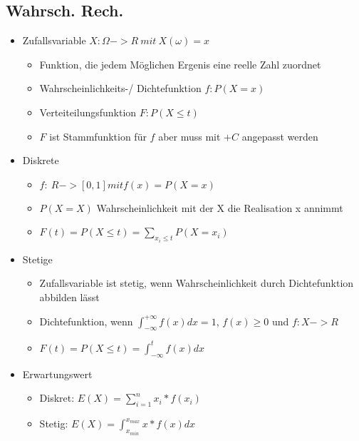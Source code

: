 \documentclass[a4paper]{article}
\begin{document}
\begin{landscape}
\begin{multicols}{4}
    \section{Wahrsch. Rech.}
    \begin{itemize}[noitemsep,nolistsep,leftmargin=*]
        \item Zufallsvariable $X : \Omega -> R\: mit\: X(\omega) = x$
        \begin{itemize}[noitemsep,nolistsep,leftmargin=*]
            \item Funktion, die jedem Möglichen Ergenis eine reelle Zahl zuordnet
            \item Wahrscheinlichkeits-/ Dichtefunktion $f: P(X =x)$
            \item Verteiteilungsfunktion $F: P(X  \leq t)$
            \item $F$ ist Stammfunktion für $f$ aber muss mit $+C$ angepasst werden
        \end{itemize}
        \item Diskrete
        \begin{itemize}[noitemsep,nolistsep,leftmargin=*]
            \item $f: \:R->[0,1] mit f(x)=P(X=x)$
            \item $P(X=X)$ Wahrscheinlichkeit mit der X die Realisation x annimmt
            \item $F(t) = P(X  \leq t) = \sum_{x_i  \leq t} P(X = x_i)$
        \end{itemize}
        \item Stetige
        \begin{itemize}[noitemsep,nolistsep,leftmargin=*]
            \item Zufallsvariable ist stetig, wenn Wahrscheinlichkeit durch Dichtefunktion abbilden lässt
            \item Dichtefunktion, wenn $\int^{+\infty}_{-\infty} f(x) dx = 1$, $f(x)  \geq 0$ und $f: X -> R$
            \item $F(t) = P(X  \leq t) = \int^{t}_{-\infty} f(x)dx$
        \end{itemize}
        \item Erwartungswert
        \begin{itemize}[noitemsep,nolistsep,leftmargin=*]
            \item Diskret: $E(X) = \sum^n_{i=1} x_i * f(x_i)$
            \item Stetig: $E(X) = \int^{x_{max}}_{x_{min}} x * f(x) dx$
        \end{itemize}

\end{itemize}
\end{multicols}
\end{landscape}
\end{document}
